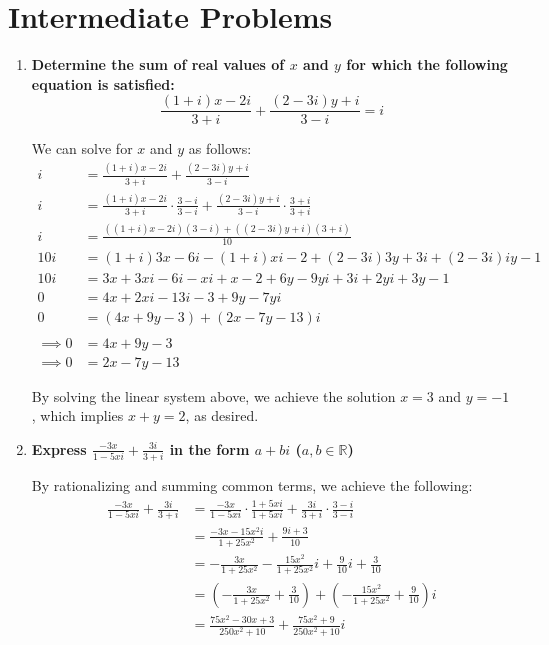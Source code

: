 \documentclass[12pt]{article}
\begin{document}
\section*{Intermediate Problems}
\begin{enumerate}
    \item \textbf{Determine the sum of real values of $x$ and $y$ for which the following equation is satisfied: $$\frac{(1+i)x-2i}{3+i} + \frac{(2-3i)y+i}{3-i} = i$$}
    
    We can solve for $x$ and $y$ as follows:
    \begin{align*}
        i &= \frac{(1+i)x-2i}{3+i} + \frac{(2-3i)y+i}{3-i} \\
        i &= \frac{(1+i)x-2i}{3+i}\cdot \frac{3 - i}{3 - i} + \frac{(2-3i)y+i}{3-i}\cdot \frac{3 + i}{3 + i} \\
        i &= \frac{((1 + i)x - 2i)(3 - i) + ((2 - 3i)y + i)(3 + i)}{10} \\
        10i &= (1 + i)3x - 6i - (1 + i)xi - 2 + (2 - 3i)3y + 3i + (2 - 3i)iy - 1 \\
        10i &= 3x + 3xi - 6i - xi + x - 2 + 6y - 9yi + 3i + 2yi + 3y - 1 \\
        0 &= 4x + 2xi - 13i - 3 + 9y - 7yi \\
        0 &= (4x + 9y - 3) + (2x - 7y - 13)i \\ \\
        \implies 0 &= 4x + 9y - 3 \\
        \implies 0 &= 2x - 7y - 13
    \end{align*}
    
    By solving the linear system above, we achieve the solution $x = 3$ and $y = -1$, which implies $x + y = 2$, as desired.
    
    \item \textbf{Express $\displaystyle{\frac{-3x}{1 - 5xi} + \frac{3i}{3 + i}}$ in the form $a + bi$ ($a, b \in \mathbb{R}$)}
    
    By rationalizing and summing common terms, we achieve the following:
    \begin{align*}
        \frac{-3x}{1 - 5xi} + \frac{3i}{3 + i} &=  \frac{-3x}{1 - 5xi} \cdot \frac{1 + 5xi}{1 + 5xi} + \frac{3i}{3 + i} \cdot \frac{3 - i}{3 - i} \\
        &= \frac{-3x - 15x^2i}{1 + 25x^2} + \frac{9i + 3}{10} \\
        &= -\frac{3x}{1 + 25x^2} - \frac{15x^2}{1 + 25x^2}i + \frac{9}{10}i + \frac{3}{10} \\
        &= (-\frac{3x}{1 + 25x^2} + \frac{3}{10}) + (-\frac{15x^2}{1 + 25x^2} + \frac{9}{10})i \\
        &= \frac{75x^2 - 30x + 3}{250x^2 + 10} + \frac{75x^2 + 9}{250x^2 + 10}i
    \end{align*}
    

\end{enumerate}
\end{document}
